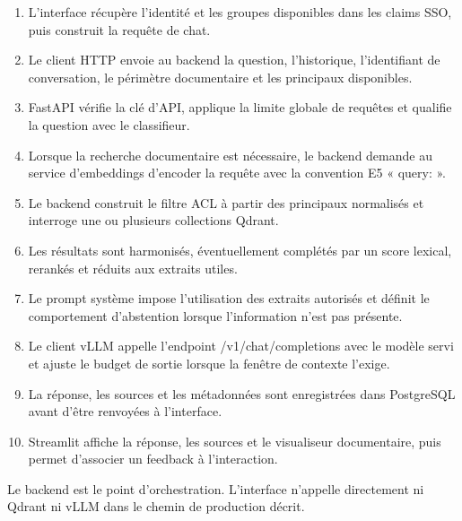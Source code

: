 \begin{enumerate}
\item L’interface récupère l’identité et les groupes disponibles dans les claims SSO, puis construit la requête de chat.
\item Le client HTTP envoie au backend la question, l’historique, l’identifiant de conversation, le périmètre documentaire et les principaux disponibles.
\item FastAPI vérifie la clé d’API, applique la limite globale de requêtes et qualifie la question avec le classifieur.
\item Lorsque la recherche documentaire est nécessaire, le backend demande au service d’embeddings d’encoder la requête avec la convention E5 « query: ».
\item Le backend construit le filtre ACL à partir des principaux normalisés et interroge une ou plusieurs collections Qdrant.
\item Les résultats sont harmonisés, éventuellement complétés par un score lexical, rerankés et réduits aux extraits utiles.
\item Le prompt système impose l’utilisation des extraits autorisés et définit le comportement d’abstention lorsque l’information n’est pas présente.
\item Le client vLLM appelle l’endpoint /v1/chat/completions avec le modèle servi et ajuste le budget de sortie lorsque la fenêtre de contexte l’exige.
\item La réponse, les sources et les métadonnées sont enregistrées dans PostgreSQL avant d’être renvoyées à l’interface.
\item Streamlit affiche la réponse, les sources et le visualiseur documentaire, puis permet d’associer un feedback à l’interaction.
\end{enumerate}

Le backend est le point d'orchestration. L'interface n'appelle directement ni Qdrant ni vLLM dans le chemin de production décrit.
